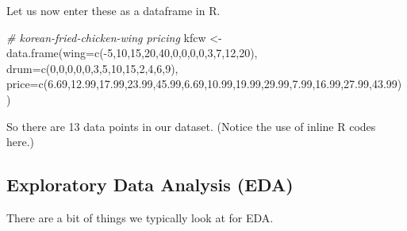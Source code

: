 \documentclass[
]{article}
\newenvironment{Shaded}{\begin{snugshade}}{\end{snugshade}}
\newcommand{\AttributeTok}[1]{\textcolor[rgb]{0.77,0.63,0.00}{#1}}
\newcommand{\CommentTok}[1]{\textcolor[rgb]{0.56,0.35,0.01}{\textit{#1}}}
\newcommand{\DecValTok}[1]{\textcolor[rgb]{0.00,0.00,0.81}{#1}}
\newcommand{\FloatTok}[1]{\textcolor[rgb]{0.00,0.00,0.81}{#1}}
\newcommand{\FunctionTok}[1]{\textcolor[rgb]{0.00,0.00,0.00}{#1}}
\newcommand{\NormalTok}[1]{#1}
\newcommand{\OtherTok}[1]{\textcolor[rgb]{0.56,0.35,0.01}{#1}}
\newcommand{\SpecialCharTok}[1]{\textcolor[rgb]{0.00,0.00,0.00}{#1}}
\begin{document}
Let us now enter these as a dataframe in R.

\begin{Shaded}
\begin{Highlighting}[]
\CommentTok{\# korean{-}fried{-}chicken{-}wing pricing}
\NormalTok{kfcw }\OtherTok{\textless{}{-}} \FunctionTok{data.frame}\NormalTok{(}\AttributeTok{wing=}\FunctionTok{c}\NormalTok{(}\SpecialCharTok{{-}}\DecValTok{5}\NormalTok{,}\DecValTok{10}\NormalTok{,}\DecValTok{15}\NormalTok{,}\DecValTok{20}\NormalTok{,}\DecValTok{40}\NormalTok{,}\DecValTok{0}\NormalTok{,}\DecValTok{0}\NormalTok{,}\DecValTok{0}\NormalTok{,}\DecValTok{0}\NormalTok{,}\DecValTok{3}\NormalTok{,}\DecValTok{7}\NormalTok{,}\DecValTok{12}\NormalTok{,}\DecValTok{20}\NormalTok{), }\AttributeTok{drum=}\FunctionTok{c}\NormalTok{(}\DecValTok{0}\NormalTok{,}\DecValTok{0}\NormalTok{,}\DecValTok{0}\NormalTok{,}\DecValTok{0}\NormalTok{,}\DecValTok{0}\NormalTok{,}\DecValTok{3}\NormalTok{,}\DecValTok{5}\NormalTok{,}\DecValTok{10}\NormalTok{,}\DecValTok{15}\NormalTok{,}\DecValTok{2}\NormalTok{,}\DecValTok{4}\NormalTok{,}\DecValTok{6}\NormalTok{,}\DecValTok{9}\NormalTok{), }\AttributeTok{price=}\FunctionTok{c}\NormalTok{(}\FloatTok{6.69}\NormalTok{,}\FloatTok{12.99}\NormalTok{,}\FloatTok{17.99}\NormalTok{,}\FloatTok{23.99}\NormalTok{,}\FloatTok{45.99}\NormalTok{,}\FloatTok{6.69}\NormalTok{,}\FloatTok{10.99}\NormalTok{,}\FloatTok{19.99}\NormalTok{,}\FloatTok{29.99}\NormalTok{,}\FloatTok{7.99}\NormalTok{,}\FloatTok{16.99}\NormalTok{,}\FloatTok{27.99}\NormalTok{,}\FloatTok{43.99}\NormalTok{) )}
\end{Highlighting}
\end{Shaded}

So there are 13 data points in our dataset. (Notice the use of inline R
codes here.)

\hypertarget{exploratory-data-analysis-eda}{%
\subsection{Exploratory Data Analysis
(EDA)}\label{exploratory-data-analysis-eda}}

There are a bit of things we typically look at for EDA.
\end{document}
